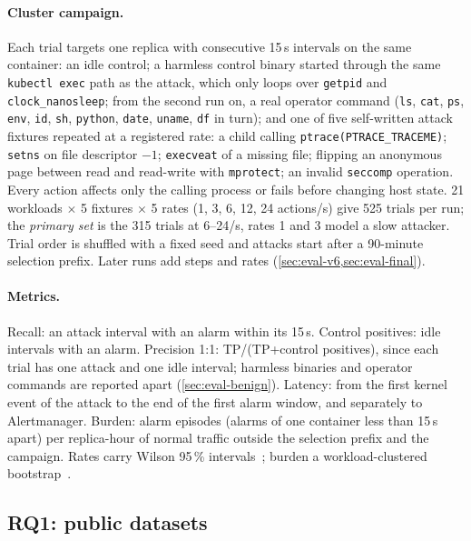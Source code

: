\paragraph{Cluster campaign.} Each trial targets one replica with consecutive 15\,s intervals on the same container: an
idle control; a harmless control binary started through the same \texttt{kubectl exec} path as the attack, which only
loops over \texttt{getpid} and \texttt{clock\_nanosleep}; from the second run on, a real operator command
(\texttt{ls}, \texttt{cat}, \texttt{ps}, \texttt{env}, \texttt{id}, \texttt{sh}, \texttt{python}, \texttt{date},
\texttt{uname}, \texttt{df} in turn); and one of five self-written attack fixtures repeated at a registered rate:
a child calling \texttt{ptrace(PTRACE\_TRACEME)}; \texttt{setns} on file descriptor $-1$; \texttt{execveat} of a
missing file; flipping an anonymous page between read and read-write with \texttt{mprotect}; an invalid
\texttt{seccomp} operation. Every action affects only the calling process or fails before changing host state.
21 workloads $\times$ 5 fixtures $\times$ 5 rates (1, 3, 6, 12, 24 actions/s) give 525 trials per run; the
\emph{primary set} is the 315 trials at 6--24/s, rates 1 and 3 model a slow attacker. Trial order is shuffled with a
fixed seed and attacks start after a 90-minute selection prefix. Later runs add steps and rates
(\cref{sec:eval-v6,sec:eval-final}).

\paragraph{Metrics.} Recall: an attack interval with an alarm within its 15\,s. Control positives: idle intervals with
an alarm. Precision 1:1: TP/(TP+control positives), since each trial has one attack and one idle interval; harmless
binaries and operator commands are reported apart (\cref{sec:eval-benign}). Latency: from the first kernel event of
the attack to the end of the first alarm window, and separately to Alertmanager. Burden: alarm episodes (alarms of one
container less than 15\,s apart) per replica-hour of normal traffic outside the selection prefix and the campaign.
Rates carry Wilson 95\,\% intervals~\cite{wilson1927}; burden a workload-clustered bootstrap~\cite{efron1993}.

\subsection{RQ1: public datasets}\label{sec:eval-datasets}

